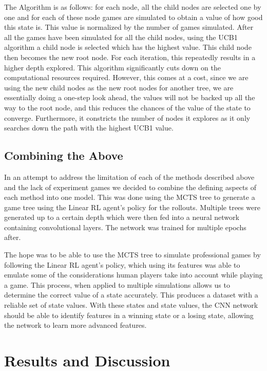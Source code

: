 \documentclass[a4paper,12pt,table]{article}
\begin{document}
The Algorithm is as follows: for each node, all the child nodes are selected one by one and for each of these node games are simulated to obtain a value of how good this state is. This value is normalized by the number of games simulated. After all the games have been simulated for all the child nodes, using the UCB1 algorithm a child node is selected which has the highest value. This child node then becomes the new root node. For each iteration, this repeatedly results in a higher depth explored. This algorithm significantly cuts down on the computational resources required. However, this comes at a cost, since we are using the new child nodes as the new root nodes for another tree, we are essentially doing a one-step look ahead, the values will not be backed up all the way to the root node, and this reduces the chances of the value of the state to converge. Furthermore, it constricts the number of nodes it explores as it only searches down the path with the highest UCB1 value. \par


\subsection{Combining the Above}

In an attempt to address the limitation of each of the methods described above and the lack of experiment games we decided to combine the defining aspects of each method into one model. This was done using the MCTS tree to generate a game tree using the Linear RL agent’s policy for the rollouts. Multiple trees were generated up to a certain depth which were then fed into a neural network containing convolutional layers. The network was trained for multiple epochs after. \par

The hope was to be able to use the MCTS tree to simulate professional games by following the Linear RL agent’s policy, which using its features was able to emulate some of the considerations human players take into account while playing a game. This process, when applied to multiple simulations allows us to determine the correct value of a state accurately. This produces a dataset with a reliable set of state values. With these states and state values, the CNN network should be able to identify features in a winning state or a losing state, allowing the network to learn more advanced features. \par

\section{Results and Discussion}
\end{document}
